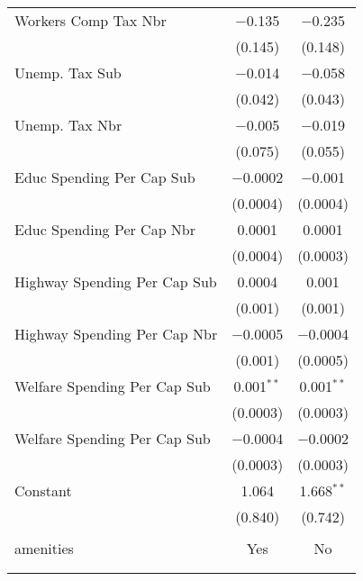 \begin{table}[!htbp]
\begin{tabular}{@{\extracolsep{5pt}}lcc}
  Workers Comp Tax Nbr & $-$0.135 & $-$0.235 \\ 
  & (0.145) & (0.148) \\ 
  Unemp. Tax Sub & $-$0.014 & $-$0.058 \\ 
  & (0.042) & (0.043) \\ 
  Unemp. Tax Nbr & $-$0.005 & $-$0.019 \\ 
  & (0.075) & (0.055) \\ 
  Educ Spending Per Cap Sub & $-$0.0002 & $-$0.001 \\ 
  & (0.0004) & (0.0004) \\ 
  Educ Spending Per Cap Nbr & 0.0001 & 0.0001 \\ 
  & (0.0004) & (0.0003) \\ 
  Highway Spending Per Cap Sub & 0.0004 & 0.001 \\ 
  & (0.001) & (0.001) \\ 
  Highway Spending Per Cap Nbr & $-$0.0005 & $-$0.0004 \\ 
  & (0.001) & (0.0005) \\ 
  Welfare Spending Per Cap Sub & 0.001$^{**}$ & 0.001$^{**}$ \\ 
  & (0.0003) & (0.0003) \\ 
  Welfare Spending Per Cap Sub & $-$0.0004 & $-$0.0002 \\ 
  & (0.0003) & (0.0003) \\ 
  Constant & 1.064 & 1.668$^{**}$ \\ 
  & (0.840) & (0.742) \\ 
 \hline \\[-1.8ex] 
amenities & Yes & No \\ 
\hline \\[-1.8ex] 
\hline 
\hline \\[-1.8ex] 
\end{tabular} 
\end{table} 
